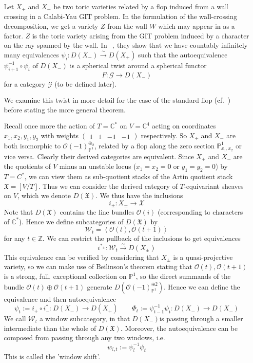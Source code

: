 Let $X_+$ and $X_-$ be two toric varieties related by a flop induced from a wall crossing in a Calabi-Yau GIT problem. In the formulation of the wall-crossing decomposition, we get a variety $Z$ from the wall $W$ which may appear in as a factor. $Z$ is the toric variety arising from the GIT problem induced by a character on the ray spanned by the wall. In ~\cite*{halpernleistner2016autoequivalences}, they show that we have countably infinitely many equivalences $\psi_{i}: D(X_{-})\xrightarrow{\sim} D(X_{+})$  such that the autoequivalence $\psi_{i+1}^{-1}\circ \psi_i$ of $D(X_{-})$ is a spherical twist around a spherical functor $$F : \mathcal{G}\to D(X_{-})$$ for a category $\mathcal{G}$ (to be defined later).

We examine this twist in more detail for the case of the standard flop (cf.~\cite*{donovan_window_2014}) before stating the more general theorem. 

Recall once more the action of $T = \mathbb{C}^*$ on $V = \mathbb{C}^4$  acting on coordinates $x_{1}, x_{2}, y_{1},y_{2}$ with weights $\begin{pmatrix}1&1&-1&-1\end{pmatrix}$ respectively. So $X_+$ and $X_-$ are both isomorphic to $\mathcal{O}(-1)_{\mathbb{P}^1}^{\oplus_{2}}$, related by a flop along the zero section $\mathbb{P}^1_{x_{1},x_{2}}$ or vice versa. Clearly their derived categories are equivalent. Since $X_+$ and $X_-$ are the quotients of $V$ minus an unstable locus ($x_{1}= x_{2}= 0$ or $y_{1}= y_{2}=0$)  by $T = C^{*}$, we can view them as sub-quotient stacks of the Artin quotient stack $\mathfrak{X}=[V/T]$. Thus we can consider the derived category of $T$-equivariant sheaves on $V$, which we denote $D(\mathfrak{X})$. We thus have the inclusions $$
i_{\pm}: X_{\pm}\to \mathcal{X}
$$
Note that $D(\mathfrak{X})$ contains the line bundles $\mathcal{O}(i)$ (corresponding to characters of $\mathbb{C}^*$).  Hence we define subcategories of $D(\mathfrak{X})$ by $$
 \mathcal{W}_{t}= \left< \mathcal{O}(t), \mathcal{O}(t+1) \right> 
$$ for any $t \in \mathbb{Z}$. We can restrict the pullback of the inclusions to get equivalences $$
i^{*_{\pm}}:\mathcal{W}_{t} \xrightarrow{\sim} D(X_{\pm})
$$
This equivalence can be verified by considering that $X_\pm$ is a quasi-projective variety, so we can make use of Beilinson's theorem stating that $\mathcal{O}(t), \mathcal{O}(t+1)$ is a strong, full, exceptional collection on $\mathbb{P}^1$, so the direct summands of the bundle $\mathcal{O}(t)\oplus \mathcal{O}(t+1)$ generate  $D(\mathcal{O}(-1)_{\mathbb{P}^{1}}^{\oplus {2}})$.  Hence we can define the equivalence and then autoequivalence $$
\psi_{t}:= i_{+}\circ i_{-}^{*}: D(X_{-})\to D(X_{+}) \qquad \Phi_{t}:= \psi_{t-1}^{-1}\psi_{t}: D(X_{-})\to D(X_{-})
$$
We call $\mathcal{W}_t$ a window subcategory, in that $D(X_{-})$is passing through a smaller intermediate than the whole of $D(\mathfrak{X})$. Moreover, the autoequivalence can be composed from passing through any two windows, i.e. $$
w_{l,t}:= \psi_{l}^{-1}\psi_t
$$
This is called the 'window shift'. 

